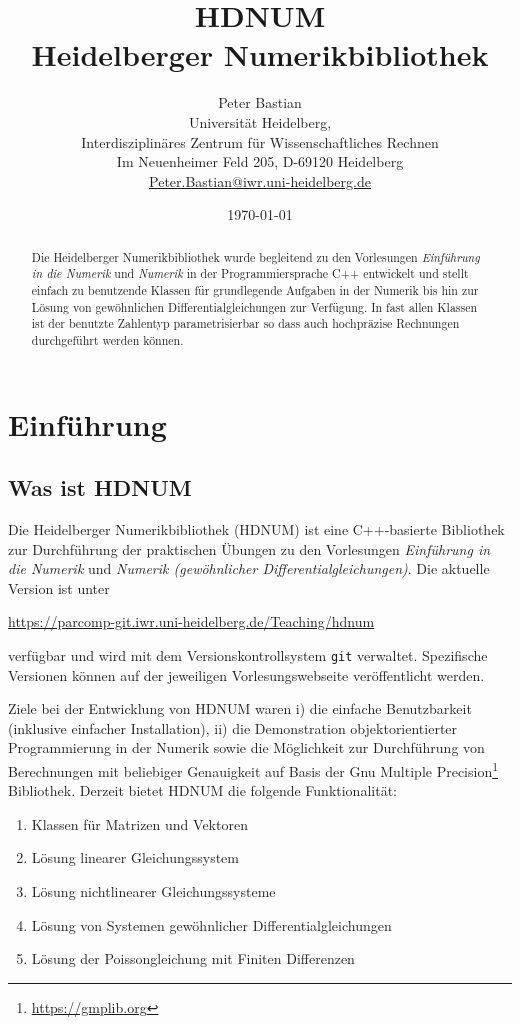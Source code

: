 \documentclass[a4paper,11pt]{article}
\title{HDNUM\\ Heidelberger Numerikbibliothek}
\author{Peter Bastian\\
  Universität Heidelberg, \\
  Interdisziplinäres Zentrum für Wissenschaftliches Rechnen\\
  Im Neuenheimer Feld 205, D-69120 Heidelberg\\
  \url{Peter.Bastian@iwr.uni-heidelberg.de}
}
\date{\today}
\theoremstyle{definition}
\begin{document}
\maketitle



\begin{abstract}
Die Heidelberger Numerikbibliothek wurde begleitend zu den Vorlesungen
\textit{Einführung in die Numerik} und \textit{Numerik} in der Programmiersprache C++
entwickelt und stellt
einfach zu benutzende Klassen für grundlegende Aufgaben in der Numerik bis hin zur Lösung
von gewöhnlichen Differentialgleichungen zur Verfügung. In fast allen Klassen ist der
benutzte Zahlentyp parametrisierbar so dass auch hochpräzise Rechnungen durchgeführt werden können.
\end{abstract}


\section{Einführung}

\subsection{Was ist HDNUM}

Die Heidelberger Numerikbibliothek (HDNUM) ist eine C++-basierte Bibliothek
zur Durchführung der praktischen Übungen zu den Vorlesungen \textit{Einführung in die
Numerik} und \textit{Numerik (gewöhnlicher Differentialgleichungen)}. Die aktuelle Version ist
unter
\begin{center}
\url{https://parcomp-git.iwr.uni-heidelberg.de/Teaching/hdnum}
\end{center}
verfügbar und wird mit dem Versionskontrollsystem \lstinline{git} verwaltet.
Spezifische Versionen können auf der jeweiligen Vorlesungswebseite veröffentlicht werden.

Ziele bei der Entwicklung von HDNUM waren i) die einfache Benutzbarkeit (inklusive einfacher
Installation),
ii) die Demonstration objektorientierter Programmierung in der Numerik sowie die
Möglichkeit zur Durchführung von Berechnungen mit beliebiger Genauigkeit auf Basis
der Gnu Multiple Precision\footnote{\url{https://gmplib.org}} Bibliothek.
Derzeit bietet HDNUM die folgende Funktionalität:
\begin{enumerate}[1)]
\item Klassen für Matrizen und Vektoren
\item Lösung linearer Gleichungssystem
\item Lösung nichtlinearer Gleichungssysteme
\item Lösung von Systemen gewöhnlicher Differentialgleichungen
\item Lösung der Poissongleichung mit Finiten Differenzen
\end{enumerate}
\end{document}
